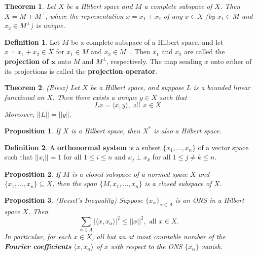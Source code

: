 \documentclass[11pt]{amsart}
\newtheorem*{theorem*}{Theorem}
\newtheorem*{proposition*}{Proposition}
\theoremstyle{definition}
\newtheorem*{definition*}{Definition}
\renewcommand\leq{\leqslant}
\renewcommand\:{\colon}
\begin{document}
\begin{theorem*}
	Let $X$ be a Hlibert space and $M$ a complete subspace of $X$. Then $X = M + M^\perp$, where the representation $x = x_1 + x_2$ of any $x \in X$ (by $x_1 \in M$ and $x_2 \in M^\perp$) is unique.
\end{theorem*}

\begin{definition*}
	Let $M$ be a complete subspace of a Hilbert space, and let $x = x_1 + x_2 \in X$ for $x_1 \in M$ and $x_2 \in M^\perp$. Then $x_1$ and $x_2$ are called the \textbf{projection of $\boldsymbol{x}$} onto $M$ and $M^\perp$, respectively. The map sending $x$ onto either of its projections is called the \textbf{projection operator}.
\end{definition*}

\begin{theorem*}
	\textnormal{(Riesz)} Let $X$ be a Hilbert space, and suppose $L$ is a bounded linear functional on $X$. Then there exists a unique $y \in X$ such that
		\[ Lx = \langle x, y \rangle, \text{ all } x \in X. \] 
	Moreover, $||L|| = ||y||$.
\end{theorem*}

\begin{proposition*}
	If $X$ is a Hilbert space, then $X^*$ is also a Hilbert space.
\end{proposition*}

\begin{definition*}
	A \textbf{orthonormal system} is a subset $\{x_1, \dots, x_n\}$ of a vector space such that $||x_i|| = 1$ for all $1 \leq i \leq n$ and $x_j \perp x_k$ for all $1 \leq j \neq k \leq n$.
\end{definition*}

\begin{proposition*}
	If $M$ is a closed subspace of a normed space $X$ and $\{x_1, \dots, x_n\} \subseteq X$, then the span $\{M, x_1, \dots, x_n\}$ is a closed subspace of $X$.
\end{proposition*}

\begin{proposition*}
	\textnormal{(Bessel's Inequality)} Suppose $\{x_\alpha\}_{\alpha \in A}$ is an ONS in a Hilbert space $X$. Then 
		\[ \sum_{\alpha \in A} |\langle x, x_\alpha \rangle|^2 \leq ||x||^2, \text{ all } x \in X. \]
	In particular, for each $x \in X$, all but an at most countable number of the \textbf{Fourier coefficients} $\langle x, x_\alpha \rangle$ of $x$ with respect to the ONS $\{x_\alpha\}$ vanish.
\end{proposition*}
\end{document}
